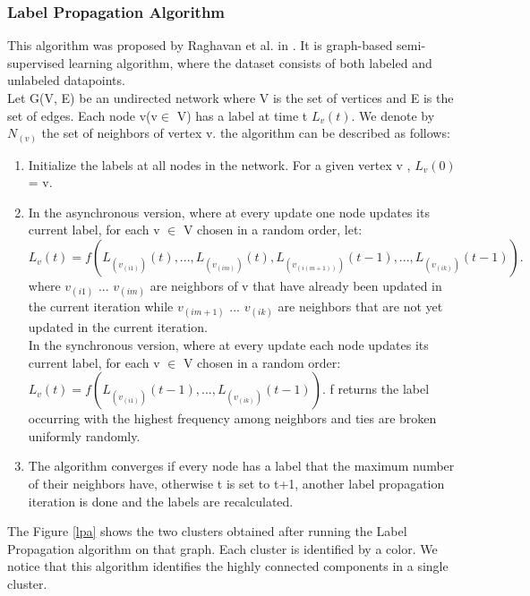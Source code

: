\subsubsection{Label Propagation Algorithm}
This algorithm was proposed by Raghavan et al. in \cite{a:labelprop}. It is graph-based semi-supervised learning algorithm, where the dataset consists of both labeled and unlabeled datapoints.\\
Let G(V, E) be an undirected network where V is the set of vertices and E is the set of edges. Each node v(v$\in$ V) has a label at time t $L_v (t)$. We denote by $N_(v)$ the set of neighbors of vertex v. the algorithm can be described as follows:
\begin{enumerate}
  \item Initialize the labels at all nodes in the network. For a given vertex v , $L_v(0)$ = v.
  \item In the asynchronous version, where at every update one node updates its current label, for each v $\in$ V chosen in a random order, let: \\
  $L_v (t) = f (L_(v_(i1))(t), ..., L_(v_(im))(t), L_(v_(i(m+1)))(t − 1), ..., L_(v_(ik))(t − 1)).$ \\where $v_(i1)$ ...  $v_(im)$ are neighbors of v that have already been updated in the current iteration while $v_(im+1)$ ... $v_(ik)$ are neighbors that are not yet updated in the current iteration. \\
  In the synchronous version, where at every update each node updates its current label, for each v $\in$ V chosen in a random order:\\$L_v (t) = f (L_(v_(i1))(t-1), ... , L_(v_(ik))(t − 1)).$
 f returns the label occurring with the highest frequency among neighbors and ties are broken uniformly randomly.
  \item The algorithm converges if every node has a label that the maximum number of their neighbors have, otherwise t is set to t+1, another label propagation iteration is done and the labels are recalculated.
\end{enumerate}  
The Figure \ref{lpa} shows the two clusters obtained after running the Label Propagation algorithm on that graph. Each cluster is identified by a color. We notice that this algorithm identifies the highly connected components in a single cluster.
  
